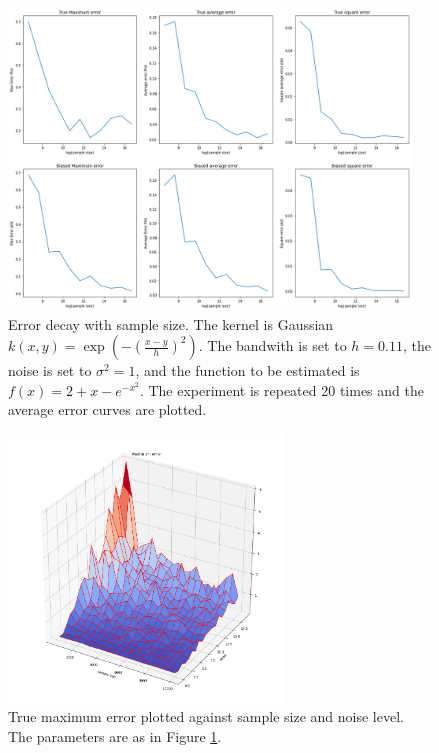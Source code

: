 \documentclass{article}
\begin{document}
\begin{figure}
    \centering
    \includegraphics[width=0.95\textwidth]{gaussian_f_3_20_sim_better_bias_estimate.png}
    \caption{Error decay with sample size. The kernel is Gaussian $k(x,y)=\exp(-(\frac{x-y}{h})^2)$. The bandwith is set to $h=0.11$, the noise is set to $\sigma^2=1$, and the function to be estimated is $f(x)=2+x-e^{-x^2}$.
    The experiment is repeated 20 times and the average error curves are plotted.
    }
    \label{fig:error_decay}
\end{figure}

\begin{figure}
    \centering
    \includegraphics[width=0.65\textwidth]{gf3_noise_samplesize_coolwarm.png}
    \caption{True maximum error plotted against sample size and noise level. The parameters are as in Figure \ref{fig:error_decay}.}
    \label{fig:3d_plot}
\end{figure}
\end{document}
